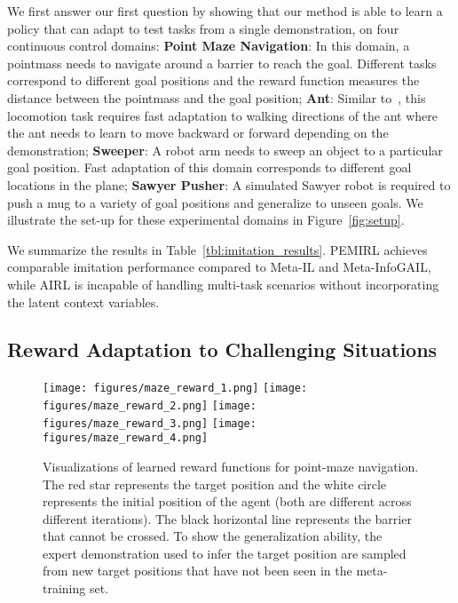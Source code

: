 We first answer our first question by showing that our method is able to learn a policy that can adapt to test tasks from a single demonstration, on four continuous control domains: \textbf{Point Maze Navigation}: In this domain, a pointmass needs to navigate around a barrier to reach the goal. Different tasks correspond to different goal positions and the reward function measures the distance between the pointmass and the goal position; \textbf{Ant}: Similar to~\cite{finn2017maml}, this locomotion task requires fast adaptation to walking directions of the ant where the ant needs to learn to move backward or forward depending on the demonstration;
\textbf{Sweeper}: A robot arm needs to sweep an object to a particular goal position. Fast adaptation of this domain corresponds to different goal locations in the plane;
\textbf{Sawyer Pusher}: A simulated Sawyer robot is required to push a mug to a variety of goal positions and generalize to unseen goals.
We illustrate the set-up for these experimental domains in Figure~\ref{fig:setup}. 

We summarize the results in Table~\ref{tbl:imitation_results}. PEMIRL achieves comparable imitation performance compared to Meta-IL and Meta-InfoGAIL, while AIRL is incapable of handling multi-task scenarios without incorporating the latent context variables.

\subsection{Reward Adaptation to Challenging Situations}


\begin{figure*}[!t]
    \centering
    \texttt{[image: figures/maze\_reward\_1.png]}
    \texttt{[image: figures/maze\_reward\_2.png]}
    \texttt{[image: figures/maze\_reward\_3.png]}
    \texttt{[image: figures/maze\_reward\_4.png]}
\caption{Visualizations of learned reward functions for point-maze navigation. The red star represents the target position and the white circle represents the initial position of the agent (both are different across different iterations). The black horizontal line represents the barrier that cannot be crossed. To show the generalization ability, the expert demonstration used to infer the target position are sampled from new target positions that have not been seen in the meta-training set.
    }
\label{fig:maze_reward_fig}
\end{figure*}

